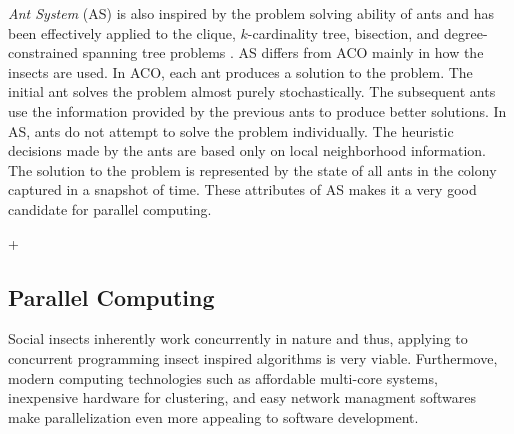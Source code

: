 \documentclass[11pt]{article}
\begin{document}

\textit{Ant System} (AS) is also inspired by the problem solving ability of ants and has been effectively applied to the clique, $k$-cardinality tree, bisection, and degree-constrained spanning tree problems \cite{BR, BS2, BS1, BZ}.  AS differs from ACO mainly in how the insects are used. In ACO, each ant produces a solution to the problem. The initial ant solves the problem almost purely stochastically. The subsequent ants use the information provided by the previous ants to produce better solutions. In AS, ants do not attempt to solve the problem individually. The heuristic decisions made by the ants are based only on local neighborhood information. The solution to the problem is represented by the state of all ants in the colony captured in a snapshot of time. These attributes of AS makes it a very good candidate for parallel computing.


+%








\subsection{Parallel Computing}

Social insects inherently work concurrently in nature and thus, applying to concurrent programming insect inspired algorithms is very viable. Furthermove, modern computing technologies such as affordable multi-core systems, inexpensive hardware for clustering, and easy network managment softwares make parallelization even more appealing to software development.
\end{document}
